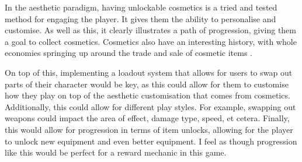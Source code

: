 \documentclass{scrartcl}
\let\citep\autocite
\begin{document}
In the aesthetic paradigm, having unlockable cosmetics is a tried and tested method for engaging the player. It gives them the ability to personalise and customise. As well as this, it clearly illustrates a path of progression, giving them a goal to collect cosmetics. Cosmetics also have an interesting history, with whole economies springing up around the trade and sale of cosmetic items \citep{GamaSutra001}.

On top of this, implementing a loadout system that allows for users to swap out parts of their character would be key, as this could allow for them to customise how they play on top of the aesthetic customisation that comes from cosmetics. Additionally, this could allow for different play styles. For example, swapping out weapons could impact the area of effect, damage type, speed, et cetera. Finally, this would allow for progression in terms of item unlocks, allowing for the player to unlock new equipment and even better equipment. I feel as though progression like this would be perfect for a reward mechanic in this game.

\printbibliography
\end{document}
